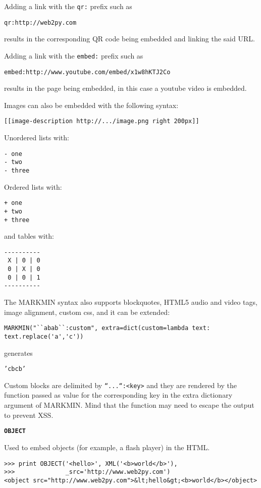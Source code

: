 \documentclass[justified,sixbynine,notoc]{tufte-book}
\def\ft{\small\tt}
\def\inxx#1{\index{#1}}
\begin{document}
\begin{fullwidth}
Adding a link with the {\ft qr:} prefix such as

\begin{lstlisting}
qr:http://web2py.com
\end{lstlisting}
\noindent results in the corresponding QR code being embedded and linking the said URL.

Adding a link with the {\ft embed:} prefix such as

\begin{lstlisting}
embed:http://www.youtube.com/embed/x1w8hKTJ2Co
\end{lstlisting}
\noindent results in the page being embedded, in this case a youtube video is embedded.

Images can also be embedded with the following syntax:

\begin{lstlisting}
[[image-description http://.../image.png right 200px]]
\end{lstlisting}

Unordered lists with:
\begin{lstlisting}
- one
- two
- three
\end{lstlisting}

Ordered lists with:
\begin{lstlisting}
+ one
+ two
+ three
\end{lstlisting}
\noindent and tables with:
\begin{lstlisting}
----------
 X | 0 | 0
 0 | X | 0
 0 | 0 | 1
----------
\end{lstlisting}

The MARKMIN syntax also supports blockquotes, HTML5 audio and video tags, image alignment, custom css, and it can be extended:

\begin{lstlisting}
MARKMIN("``abab``:custom", extra=dict(custom=lambda text: text.replace('a','c'))
\end{lstlisting}
\noindent generates

{\ft 'cbcb'}

Custom blocks are delimited by {\ft ``...``:<key>} and they are rendered by the function passed as value for the corresponding key in the extra dictionary argument of MARKMIN. Mind that the function may need to escape the output to prevent XSS.

{\bf {\ft OBJECT}}

Used to embed objects (for example, a flash player) in the HTML.

\inxx{OBJECT}
\begin{lstlisting}
>>> print OBJECT('<hello>', XML('<b>world</b>'),
>>>              _src='http://www.web2py.com')
<object src="http://www.web2py.com">&lt;hello&gt;<b>world</b></object>
\end{lstlisting}


\end{fullwidth}
\end{document}
